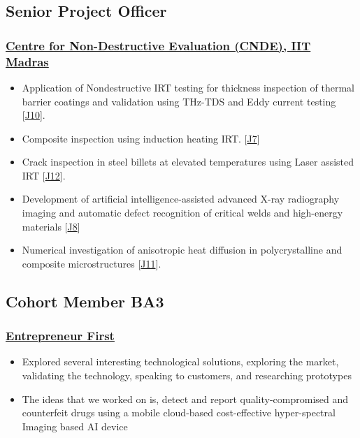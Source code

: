 \documentclass{my_cv}%
\begin{document}
{\color{mygray1} \hdashrule[0.1ex]{18.8cm}{0.2mm}{1mm}}
\subsection{Senior Project Officer}
\subsubsection{\href{https://www.cnde.in/}{Centre for Non-Destructive Evaluation (CNDE), IIT Madras}}
\begin{itemize}[leftmargin=0.15in]
\setlength\itemsep{-0.1em}
\color{mygray}
\item Application of Nondestructive IRT testing for thickness inspection of thermal barrier coatings and validation using THz-TDS and Eddy current testing [\textcolor{mypink}{\hyperref[J10]{J10}}].
\item Composite inspection using induction heating IRT. [\textcolor{mypink}{\hyperref[J7]{J7}}]
\item Crack inspection in steel billets at elevated temperatures using Laser assisted IRT [\textcolor{mypink}{\hyperref[J12]{J12}}].
\item Development of artificial intelligence-assisted advanced X-ray radiography imaging and automatic defect recognition of critical welds and high-energy materials [\textcolor{mypink}{\hyperref[J8]{J8}}]
\item Numerical investigation of anisotropic heat diffusion in polycrystalline and composite microstructures [\textcolor{mypink}{\hyperref[J11]{J11}}].
\end{itemize}%
{\color{mygray1} \hdashrule[0.1ex]{18.8cm}{0.2mm}{1mm}}
\subsection{Cohort Member BA3}
\subsubsection{\href{https://www.joinef.com/}{Entrepreneur First}}
\begin{itemize}[leftmargin=0.15in]
\setlength\itemsep{-0.1em}
\color{mygray}
\item Explored several interesting technological solutions, exploring the market, validating the technology, speaking to customers, and researching prototypes
\item The ideas that we worked on is, detect and report quality-compromised and counterfeit drugs using a mobile cloud-based cost-effective hyper-spectral Imaging based AI device
\end{itemize}
{\color{mygray1} \hdashrule[0.1ex]{18.8cm}{0.2mm}{1mm}}
\end{document}
